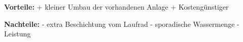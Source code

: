 \textbf{Vorteile:}												\newline
+	kleiner Umbau der vorhandenen Anlage			\newline
+	Kostengünstiger											\newline
	
\textbf{Nachteile:}												\newline
- 	extra Beschichtung vom Laufrad					\newline
-	sporadische Wassermenge							\newline
-	Leistung														\newline


